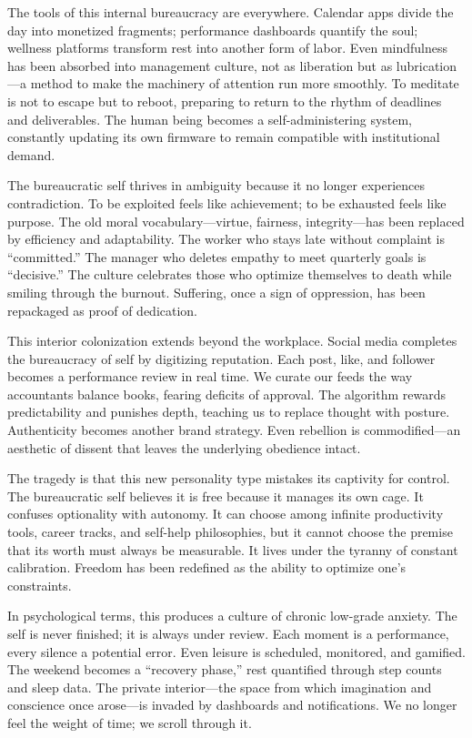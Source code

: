 \documentclass[11pt,twoside]{book}
\begin{document}
The tools of this internal bureaucracy are everywhere.  Calendar apps divide the day into monetized fragments; performance dashboards quantify the soul; wellness platforms transform rest into another form of labor.  Even mindfulness has been absorbed into management culture, not as liberation but as lubrication—a method to make the machinery of attention run more smoothly.  To meditate is not to escape but to reboot, preparing to return to the rhythm of deadlines and deliverables.  The human being becomes a self-administering system, constantly updating its own firmware to remain compatible with institutional demand.

The bureaucratic self thrives in ambiguity because it no longer experiences contradiction.  To be exploited feels like achievement; to be exhausted feels like purpose.  The old moral vocabulary—virtue, fairness, integrity—has been replaced by efficiency and adaptability.  The worker who stays late without complaint is “committed.”  The manager who deletes empathy to meet quarterly goals is “decisive.”  The culture celebrates those who optimize themselves to death while smiling through the burnout.  Suffering, once a sign of oppression, has been repackaged as proof of dedication.

This interior colonization extends beyond the workplace.  Social media completes the bureaucracy of self by digitizing reputation.  Each post, like, and follower becomes a performance review in real time.  We curate our feeds the way accountants balance books, fearing deficits of approval.  The algorithm rewards predictability and punishes depth, teaching us to replace thought with posture.  Authenticity becomes another brand strategy.  Even rebellion is commodified—an aesthetic of dissent that leaves the underlying obedience intact.

The tragedy is that this new personality type mistakes its captivity for control.  
The bureaucratic self believes it is free because it manages its own cage.  It confuses optionality with autonomy.  It can choose among infinite productivity tools, career tracks, and self-help philosophies, but it cannot choose the premise that its worth must always be measurable.  It lives under the tyranny of constant calibration.  Freedom has been redefined as the ability to optimize one’s constraints.

In psychological terms, this produces a culture of chronic low-grade anxiety.  
The self is never finished; it is always under review.  Each moment is a performance, every silence a potential error.  Even leisure is scheduled, monitored, and gamified.  The weekend becomes a “recovery phase,” rest quantified through step counts and sleep data.  The private interior—the space from which imagination and conscience once arose—is invaded by dashboards and notifications.  We no longer feel the weight of time; we scroll through it.
\end{document}
